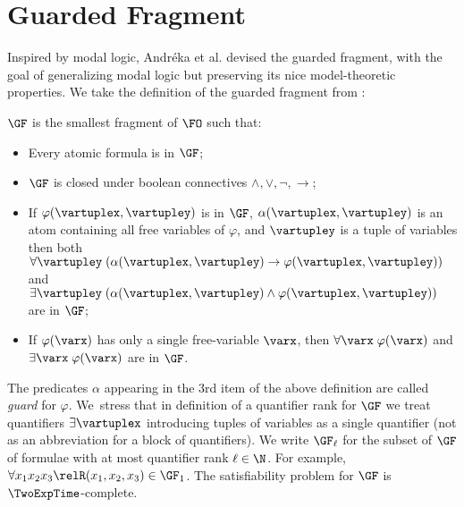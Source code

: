 \section{Guarded Fragment}
Inspired by modal logic, Andréka et al. devised the guarded fragment, with the goal of generalizing modal logic but preserving its nice model-theoretic properties\cite{AndrekaNB98}.
We take the definition of the guarded fragment from \cite{BednarczykJ22}:
\begin{definition}
  $\GF$ is the smallest fragment of $\FO$  such that:
  \begin{itemize}\itemsep0em
      \item Every atomic formula is in $\GF$;
      \item $\GF$ is closed under boolean connectives $\land, \lor, \neg, \to$;
      \item If $\varphi(\vartuplex, \vartupley)$ is in $\GF$, $\alpha(\vartuplex, \vartupley)$ is an atom containing all free variables of $\varphi$, and $\vartupley$ is a tuple of variables then both $\forall{\vartupley} \; (\alpha(\vartuplex, \vartupley) \to \varphi(\vartuplex, \vartupley))$ and $\exists{\vartupley} \; (\alpha(\vartuplex, \vartupley) \land \varphi(\vartuplex, \vartupley))$ are in $\GF$;
      \item If $\varphi(\varx)$ has only a single free-variable $\varx$, then $\forall{\varx}\; \varphi(\varx)$ and $\exists{\varx}\; \varphi(\varx)$ are in $\GF$.
  \end{itemize}
\end{definition}
The predicates $\alpha$ appearing in the 3rd item of the above definition are called \emph{guard} for $\varphi$.
We~stress that in definition of a quantifier rank for $\GF$ we treat quantifiers $\exists{\vartuplex}$ introducing tuples of variables as a single quantifier (not as an abbreviation for a block of quantifiers).
We write $\GF_{\ell}$ for the subset of $\GF$ of formulae with at most quantifier rank $\ell \in \N$.
For example, $\forall{x_{1}x_{2}x_{3}} \relR(x_{1}, x_{2}, x_{3}) \in \GF_{1}$.
The satisfiability problem for $\GF$ is $\TwoExpTime$-complete.

